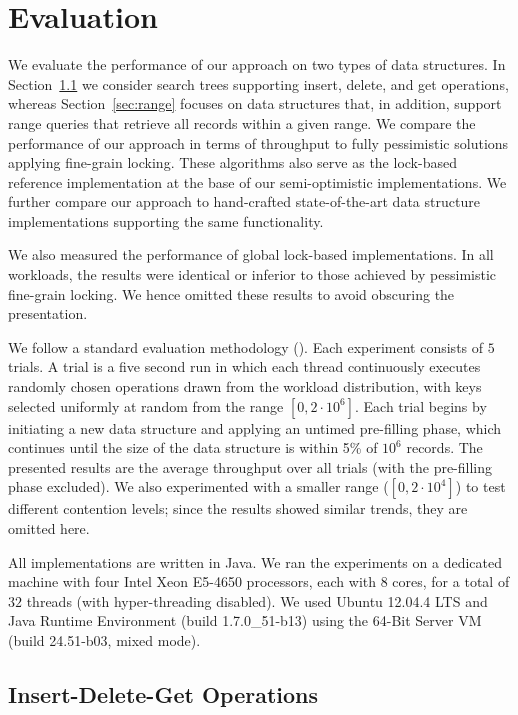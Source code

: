 \section{Evaluation}
\label{sec:eval}

We evaluate the performance of our approach on two types of data
structures. In Section~\ref{sec:readwrite} we consider search trees
supporting insert, delete, and get operations, whereas Section~\ref{sec:range}
focuses on data structures that, in addition, support range queries that retrieve all
records within a given range. We compare the performance of our approach in terms of
throughput to fully pessimistic solutions applying fine-grain locking. These
algorithms also serve as the lock-based reference implementation at the base of
our semi-optimistic implementations.
We further
compare our approach to hand-crafted state-of-the-art data structure
implementations supporting the same functionality.

We also measured the performance of global lock-based implementations.
In all workloads, the results were identical or inferior to those
achieved by pessimistic fine-grain locking. We hence
omitted these results to avoid obscuring the presentation.

We follow a standard evaluation methodology
(\cite{DrachslerVY2014,NatarajanM2014,BrownER2014,ArbelA2014}). Each experiment
consists of $5$ trials. A trial is a five second run in which each thread continuously executes
randomly chosen operations drawn from the workload distribution, with keys
selected uniformly at random from the range $[0,2\cdot10^6]$.
Each trial begins by initiating a new data structure and applying an untimed pre-filling
phase, which continues until the size of the data structure is within 5\% of
$10^6$ records. The presented results are the average throughput over all trials
(with the pre-filling phase excluded).
We also experimented with a smaller range ($[0,2\cdot10^4]$) to test different
contention levels; since the results showed similar trends, they are omitted here.

All implementations are written in Java. We ran the experiments on a dedicated machine with
four Intel Xeon E5-4650 processors, each with $8$ cores, for a total of $32$ threads
(with hyper-threading disabled).
We used Ubuntu 12.04.4 LTS and Java Runtime Environment (build
1.7.0\_51-b13) using the 64-Bit Server VM (build 24.51-b03, mixed mode).

\subsection{Insert-Delete-Get Operations}
\label{sec:readwrite}

